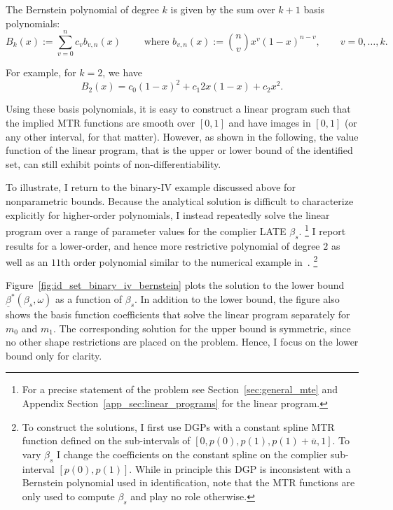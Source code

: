 \documentclass[12pt,a4paper,english]{article} %
\numberwithin{equation}{section}
\theoremstyle{definition}
\theoremstyle{remark}
\theoremstyle{plain}
\begin{document}
The Bernstein polynomial of degree $k$ is given by the sum over $k+1$ basis polynomials:
\begin{equation*}
  B_k(x) := \sum_{v=0}^n c_v b_{v,n}(x) \qquad \text{ where } b_{v,n}(x) := \binom{n}{v} x^v(1-x)^{n-v}, \qquad v = 0, \ldots, k.
\end{equation*}

For example, for $k=2$, we have
\begin{equation*}
  B_2(x) = c_0 (1-x)^2 + c_1 2x(1-x) + c_2 x^2.
\end{equation*}

Using these basis polynomials, it is easy to construct a linear program such that the implied MTR functions are smooth over $[0,1]$ and have images in $[0,1]$ (or any other interval, for that matter).
However, as shown in the following, the value function of the linear program, that is the upper or lower bound of the identified set, can still exhibit points of non-differentiability.

To illustrate, I return to the binary-IV example discussed above for nonparametric bounds.
Because the analytical solution is difficult to characterize explicitly for higher-order polynomials, I instead repeatedly solve the linear program over a range of parameter values for the complier LATE $\beta_s$.
\footnote{For a precise statement of the problem see Section~\ref{sec:general_mte} and Appendix Section~\ref{app_sec:linear_programs} for the linear program.}
I report results for a lower-order, and hence more restrictive polynomial of degree $2$ as well as an $11$th order polynomial similar to the numerical example in~\cite{mogstad2018using}.
\footnote{
  To construct the solutions, I first use DGPs with a constant spline MTR function defined on the sub-intervals of $[0, p(0), p(1), p(1) + \overline{u}, 1]$.
  To vary $\beta_s$ I change the coefficients on the constant spline on the complier sub-interval $[p(0), p(1)]$.
  While in principle this DGP is inconsistent with a Bernstein polynomial used in identification,
  note that the MTR functions are only used to compute $\beta_s$ and play no role otherwise.
}

Figure~\ref{fig:id_set_binary_iv_bernstein} plots the solution to the lower bound $\underline{\beta}^*(\beta_s, \omega)$ as a function of $\beta_s$.
In addition to the lower bound, the figure also shows the basis function coefficients that solve the linear program separately for $m_0$ and $m_1$.
The corresponding solution for the upper bound is symmetric, since no other shape restrictions are placed on the problem. Hence, I focus on the lower bound only for clarity.
\end{document}
